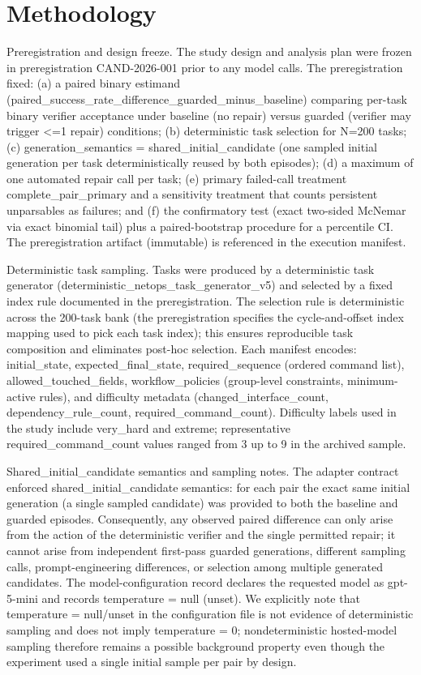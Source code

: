 \documentclass[conference]{IEEEtran}
\begin{document}
\section{Methodology}
Preregistration and design freeze. The study design and analysis plan were frozen in preregistration CAND-2026-001 prior to any model calls. The preregistration fixed: (a) a paired binary estimand (paired\_success\_rate\_difference\_guarded\_minus\_baseline) comparing per-task binary verifier acceptance under baseline (no repair) versus guarded (verifier may trigger <=1 repair) conditions; (b) deterministic task selection for N=200 tasks; (c) generation\_semantics = shared\_initial\_candidate (one sampled initial generation per task deterministically reused by both episodes); (d) a maximum of one automated repair call per task; (e) primary failed-call treatment complete\_pair\_primary and a sensitivity treatment that counts persistent unparsables as failures; and (f) the confirmatory test (exact two-sided McNemar via exact binomial tail) plus a paired-bootstrap procedure for a percentile CI. The preregistration artifact (immutable) is referenced in the execution manifest.

Deterministic task sampling. Tasks were produced by a deterministic task generator (deterministic\_netops\_task\_generator\_v5) and selected by a fixed index rule documented in the preregistration. The selection rule is deterministic across the 200-task bank (the preregistration specifies the cycle-and-offset index mapping used to pick each task index); this ensures reproducible task composition and eliminates post-hoc selection. Each manifest encodes: initial\_state, expected\_final\_state, required\_sequence (ordered command list), allowed\_touched\_fields, workflow\_policies (group-level constraints, minimum-active rules), and difficulty metadata (changed\_interface\_count, dependency\_rule\_count, required\_command\_count). Difficulty labels used in the study include very\_hard and extreme; representative required\_command\_count values ranged from 3 up to 9 in the archived sample.

Shared\_initial\_candidate semantics and sampling notes. The adapter contract enforced shared\_initial\_candidate semantics: for each pair the exact same initial generation (a single sampled candidate) was provided to both the baseline and guarded episodes. Consequently, any observed paired difference can only arise from the action of the deterministic verifier and the single permitted repair; it cannot arise from independent first-pass guarded generations, different sampling calls, prompt-engineering differences, or selection among multiple generated candidates. The model-configuration record declares the requested model as gpt-5-mini and records temperature = null (unset). We explicitly note that temperature = null/unset in the configuration file is not evidence of deterministic sampling and does not imply temperature = 0; nondeterministic hosted-model sampling therefore remains a possible background property even though the experiment used a single initial sample per pair by design.
\end{document}
